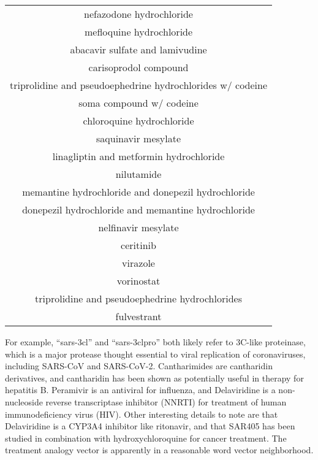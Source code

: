 \documentclass{article}
\newcommand{\lgc}[1]{\cellcolor[gray]{0.85}#1}
\begin{document}
\begin{table}[t!]
\begin{tabular}[t]{c}
nefazodone hydrochloride \\
\lgc{mefloquine hydrochloride\cite{Weston2020.03.25.008482}} \\
abacavir sulfate and lamivudine \\
carisoprodol compound \\
triprolidine and pseudoephedrine hydrochlorides w/ codeine \\
soma compound w/ codeine \\
\lgc{chloroquine hydrochloride\cite{wang2020remdesivir}} \\
saquinavir mesylate \\
linagliptin and metformin hydrochloride \\
nilutamide \\
memantine hydrochloride and donepezil hydrochloride \\
donepezil hydrochloride and memantine hydrochloride \\
\lgc{nelfinavir mesylate\cite{Xu2020.01.27.921627}} \\
ceritinib \\
virazole \\
vorinostat \\
triprolidine and pseudoephedrine hydrochlorides \\
fulvestrant \\
\hline
\end{tabular}
\end{table}

For example, ``sars-3cl'' and ``sars-3clpro'' both likely refer to 3C-like proteinase, which is a major protease thought essential to viral replication of coronaviruses, including SARS-CoV and SARS-CoV-2\cite{goetz2007substrate,zhang2020crystal}.
Cantharimides are cantharidin derivatives, and cantharidin has been shown as potentially useful in therapy for hepatitis B\cite{romero2007effect}.
Peramivir is an antiviral for influenza, and Delaviridine is a non-nucleoside reverse transcriptase inhibitor (NNRTI) for treatment of human immunodeficiency virus (HIV).
Other interesting details to note are that Delaviridine is a CYP3A4 inhibitor\cite{famil2006guidelines} like ritonavir, and that SAR405 has been studied in combination with hydroxychloroquine for cancer treatment\cite{shi2017research}.
The treatment analogy vector is apparently in a reasonable word vector neighborhood.
\end{document}
